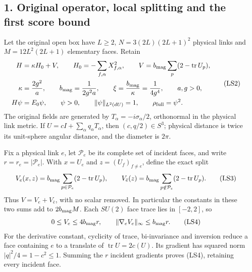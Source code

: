 \documentclass[11pt]{article}
\begin{document}
\subsection*{1. Original operator, local splitting and the first score bound}

Let the original open box have \(L\ge2\),
\(N=3(2L)(2L+1)^2\) physical links and
\(M=12L^2(2L+1)\) elementary faces. Retain
\[
 \begin{aligned}
 H&=\kappa H_0+V,\qquad
 H_0=-\sum_{f,\alpha}X_{f,\alpha}^2,\qquad
 V=b_{\rm mag}\sum_p(2-\operatorname{tr}U_p),\\
 \kappa&={2g^2\over a},\qquad
 b_{\rm mag}={1\over2g^2a},\qquad
 \xi={b_{\rm mag}\over\kappa}={1\over4g^4},\qquad a,g>0,\\
 H\psi&=E_0\psi,\qquad \psi>0,\qquad \|\psi\|_{L^2(dU)}=1,
 \qquad \rho_{\rm full}=\psi^2.
 \end{aligned}
 \tag{LS2}
\]
The original fields are generated by
\(T_\alpha=-i\sigma_\alpha/2\), orthonormal in the physical link
metric. If \(U=cI+\sum_\alpha q_\alpha T_\alpha\), then
\((c,q/2)\in S^3\); physical distance is twice its unit-sphere
angular distance, and the diameter is \(2\pi\).

Fix a physical link \(e\), let \(\mathcal P_e\) be its complete
set of incident faces, and write \(r=r_e=|\mathcal P_e|\).
With \(x=U_e\) and \(z=(U_f)_{f\ne e}\), define the exact split
\[
 V_e(x,z)=b_{\rm mag}\sum_{p\in\mathcal P_e}
                         (2-\operatorname{tr}U_p),\qquad
 V_{\bar e}(z)=b_{\rm mag}\sum_{p\notin\mathcal P_e}
                         (2-\operatorname{tr}U_p).
 \tag{LS3}
\]
Thus \(V=V_e+V_{\bar e}\), with no scalar removed. In particular
the constants in these two sums add to \(2b_{\rm mag}M\).
Each \(SU(2)\) face trace lies in \([-2,2]\), so
\[
 0\le V_e\le4b_{\rm mag}r,\qquad
 \|\nabla_eV_e\|_\infty\le b_{\rm mag}r.
 \tag{LS4}
\]
For the derivative constant, cyclicity of trace, bi-invariance
and inversion reduce a face containing \(e\) to a translate of
\(\operatorname{tr}U=2c(U)\). Its gradient has squared norm
\(|q|^2/4=1-c^2\le1\). Summing the \(r\) incident gradients
proves (LS4), retaining every incident face.
\end{document}
